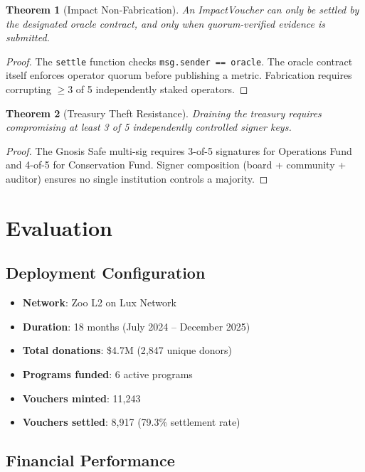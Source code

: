\documentclass[11pt,letterpaper]{article}
\newtheorem{theorem}{Theorem}[section]
\begin{document}
\begin{theorem}[Impact Non-Fabrication]
An ImpactVoucher can only be settled by the designated oracle contract, and only when quorum-verified evidence is submitted.
\end{theorem}

\begin{proof}
The \texttt{settle} function checks \texttt{msg.sender == oracle}. The oracle contract itself enforces operator quorum before publishing a metric. Fabrication requires corrupting $\geq 3$ of 5 independently staked operators.
\end{proof}

\begin{theorem}[Treasury Theft Resistance]
Draining the treasury requires compromising at least 3 of 5 independently controlled signer keys.
\end{theorem}

\begin{proof}
The Gnosis Safe multi-sig requires 3-of-5 signatures for Operations Fund and 4-of-5 for Conservation Fund. Signer composition (board + community + auditor) ensures no single institution controls a majority.
\end{proof}

\section{Evaluation}
\label{sec:evaluation}

\subsection{Deployment Configuration}

\begin{itemize}
    \item \textbf{Network}: Zoo L2 on Lux Network
    \item \textbf{Duration}: 18 months (July 2024 -- December 2025)
    \item \textbf{Total donations}: \$4.7M (2{,}847 unique donors)
    \item \textbf{Programs funded}: 6 active programs
    \item \textbf{Vouchers minted}: 11{,}243
    \item \textbf{Vouchers settled}: 8{,}917 (79.3\% settlement rate)
\end{itemize}

\subsection{Financial Performance}
\end{document}
